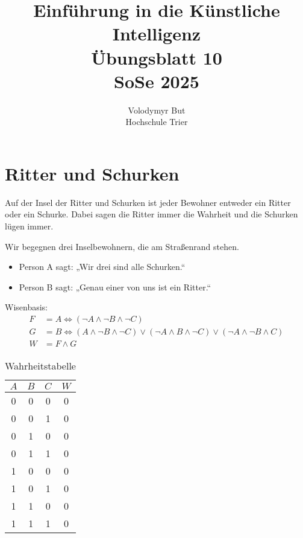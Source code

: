 \documentclass[10pt, oneside]{article}
\title{Einführung in die Künstliche Intelligenz\\[15pt]\Large{Übungsblatt 10}\\[10pt]\Large{SoSe 2025}}
\author{Volodymyr But\\[10pt]Hochschule Trier}
\date{}
\begin{document}
\maketitle
\vspace{25px}

\section{Ritter und Schurken}

Auf der Insel der Ritter und Schurken ist jeder Bewohner entweder ein Ritter oder ein
Schurke. Dabei sagen die Ritter immer die Wahrheit und die Schurken lügen immer.

Wir begegnen drei Inselbewohnern, die am Straßenrand stehen.
\begin{itemize}
    \item Person A sagt: „Wir drei sind alle Schurken.“
    \item Person B sagt: „Genau einer von uns ist ein Ritter.“
\end{itemize}
Wisenbasis:
\begin{align*}
    F &= A \Leftrightarrow (\lnot A \land \lnot B \land \lnot C) \\[5pt]
    G &= B \Leftrightarrow (A \land \lnot B \land \lnot C) \lor (\lnot A \land B \land \lnot C) \lor (\lnot A \land \lnot B \land C) \\[5pt]
    W &= F \land G
\end{align*}
\begin{table}[h]
    \centering
    \begin{tabular}{c|c|c|c}
        $A$    & $B$    & $C$    & $W$    \\
        \hline
        0 & 0 & 0 & 0 \\
        0 & 0 & 1 & 0 \\
        0 & 1 & 0 & 0 \\
        0 & 1 & 1 & 0 \\
        1 & 0 & 0 & 0 \\
        1 & 0 & 1 & 0 \\
        1 & 1 & 0 & 0 \\
        1 & 1 & 1 & 0 \\
    \end{tabular}
    \caption{Wahrheitstabelle}
\end{table}
\end{document}
